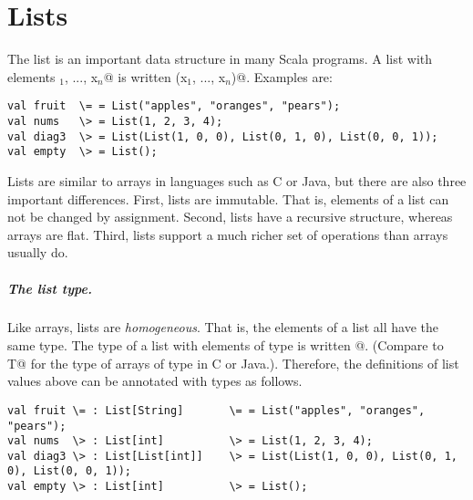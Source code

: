 \documentclass[11pt]{book}
\begin{document}
\chapter{Lists}

The list is an important data structure in many Scala programs.  
A list with elements \verb@x$_1$, ..., x$_n$@ is written
\verb@List(x$_1$, ..., x$_n$)@. Examples are:
\begin{verbatim}
val fruit  \= = List("apples", "oranges", "pears");
val nums   \> = List(1, 2, 3, 4);
val diag3  \> = List(List(1, 0, 0), List(0, 1, 0), List(0, 0, 1));
val empty  \> = List();
\end{verbatim}
Lists are similar to arrays in languages such as C or Java, but there
are also three important differences. First, lists are immutable. That
is, elements of a list can not be changed by assignment. Second, 
lists have a recursive structure, whereas arrays are flat. Third,
lists support a much richer set of operations than arrays usually do.

\paragraph{The list type.}
Like arrays, lists are {\em homogeneous}. That is, the elements of a
list all have the same type.  The type of a list with elements of type
\verb@T@ is written \verb@List[T]@. (Compare to \verb@[]T@ for the
type of arrays of type \verb@T@ in C or Java.). Therefore, the 
definitions of list values above can be annotated with types as
follows.
\begin{verbatim}
val fruit \= : List[String]       \= = List("apples", "oranges", "pears");
val nums  \> : List[int]          \> = List(1, 2, 3, 4);
val diag3 \> : List[List[int]]    \> = List(List(1, 0, 0), List(0, 1, 0), List(0, 0, 1));
val empty \> : List[int]          \> = List();
\end{verbatim}
\end{document}

